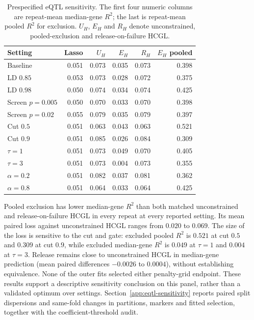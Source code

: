 \documentclass[11pt,a4paper]{article}
\begin{document}
\begin{table}[htbp]\centering\small
\caption{Prespecified eQTL sensitivity. The first four numeric columns are repeat-mean median-gene $R^2$; the last is repeat-mean pooled $R^2$ for exclusion. $U_H$, $E_H$ and $R_H$ denote unconstrained, pooled-exclusion and release-on-failure HCGL.}\label{tab:eqtl-sensitivity}
\begin{tabular}{lrrrrr}\toprule
Setting & Lasso & $U_H$ & $E_H$ & $R_H$ & $E_H$ pooled\\\midrule
Baseline & 0.051 & 0.073 & 0.035 & 0.073 & 0.398 \\
LD $0.85$ & 0.053 & 0.073 & 0.028 & 0.072 & 0.375 \\
LD $0.98$ & 0.050 & 0.074 & 0.034 & 0.074 & 0.425 \\
Screen $p=0.005$ & 0.050 & 0.070 & 0.033 & 0.070 & 0.398 \\
Screen $p=0.02$ & 0.055 & 0.079 & 0.035 & 0.079 & 0.397 \\
Cut $0.5$ & 0.051 & 0.063 & 0.043 & 0.063 & 0.521 \\
Cut $0.9$ & 0.051 & 0.085 & 0.026 & 0.084 & 0.309 \\
$\tau=1$ & 0.051 & 0.073 & 0.049 & 0.070 & 0.405 \\
$\tau=3$ & 0.051 & 0.073 & 0.004 & 0.073 & 0.355 \\
$\alpha=0.2$ & 0.051 & 0.082 & 0.037 & 0.081 & 0.362 \\
$\alpha=0.8$ & 0.051 & 0.064 & 0.033 & 0.064 & 0.425 \\
\bottomrule\end{tabular}\end{table}
Pooled exclusion has lower median-gene $R^2$ than both matched unconstrained and release-on-failure HCGL in every repeat at every reported setting. Its mean paired loss against unconstrained HCGL ranges from $0.020$ to $0.069$. The size of the loss is sensitive to the cut and gate: excluded pooled $R^2$ is $0.521$ at cut $0.5$ and $0.309$ at cut $0.9$, while excluded median-gene $R^2$ is $0.049$ at $\tau=1$ and $0.004$ at $\tau=3$. Release remains close to unconstrained HCGL in median-gene prediction (mean paired differences $-0.0026$ to $0.0004$), without establishing equivalence. None of the outer fits selected either penalty-grid endpoint. These results support a descriptive sensitivity conclusion on this panel, rather than a validated optimum over settings.
Section~\ref{app:eqtl-sensitivity} reports paired split dispersions and same-fold changes in partitions, markers and fitted selection, together with the coefficient-threshold audit.
\end{document}
